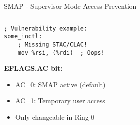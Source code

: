 \documentclass[aspectratio=169,12pt]{beamer}
\begin{document}
\begin{frame}[fragile]{SMAP - Supervisor Mode Access Prevention}
\begin{columns}
\begin{column}{0.5\textwidth}
\begin{tcolorbox}[colback=gray!10]
\begin{verbatim}
; Vulnerability example:
some_ioctl:
    ; Missing STAC/CLAC!
    mov %rsi, (%rdi)  ; Oops!
                \end{verbatim}
            \end{tcolorbox}
            
            \textbf{EFLAGS.AC bit:}
            \begin{itemize}
                \item AC=0: SMAP active (default)
                \item AC=1: Temporary user access
                \item Only changeable in Ring 0
            \end{itemize}
        \end{column}
    \end{columns}
\end{frame}
\end{document}

